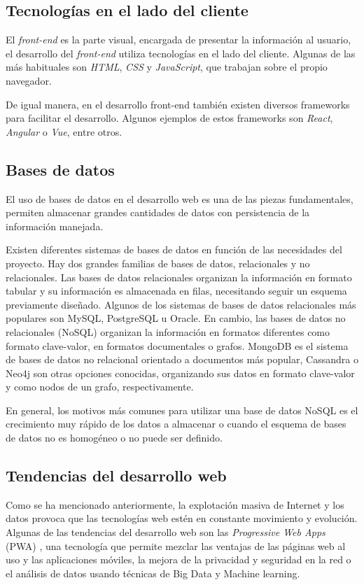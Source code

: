 \documentclass[a4paper, 12pt, oneside]{book}
\begin{document}
\subsection{Tecnologías en el lado del cliente}
\label{subsec:tecnlogías en el lado del cliente}
El \textit{front-end} es la parte visual, encargada de presentar la información al usuario, el desarrollo del \textit{front-end} utiliza tecnologías en el lado del cliente. Algunas de las más habituales son \textit{HTML}, \textit{CSS} y \textit{JavaScript}, que trabajan sobre el propio navegador.

De igual manera, en el desarrollo front-end también existen diversos frameworks para facilitar el desarrollo. Algunos ejemplos de estos frameworks son \textit{React}, \textit{Angular} o \textit{Vue}, entre otros.

\subsection{Bases de datos}
\label{subsec: bases de datos}
El uso de bases de datos en el desarrollo web es una de las piezas fundamentales, permiten almacenar grandes cantidades de datos con persistencia de la información manejada.

Existen diferentes sistemas de bases de datos en función de las necesidades del proyecto. Hay dos grandes familias de bases de datos, relacionales y no relacionales. Las bases de datos relacionales organizan la información en formato tabular y su información es almacenada en filas, necesitando seguir un esquema previamente diseñado. Algunos de los sistemas de bases de datos relacionales más populares son MySQL, PostgreSQL u Oracle. En cambio, las bases de datos no relacionales (NoSQL) organizan la información en formatos diferentes como formato clave-valor, en formatos documentales o grafos. MongoDB es el sistema de bases de datos no relacional orientado a documentos más popular, Cassandra o Neo4j son otras opciones conocidas, organizando sus datos en formato clave-valor y como nodos de un grafo, respectivamente.

En general, los motivos más comunes para utilizar una base de datos NoSQL es el crecimiento muy rápido de los datos a almacenar o cuando el esquema de bases de datos no es homogéneo o no puede ser definido.

\subsection{Tendencias del desarrollo web}
\label{subsec: tendencias del desarrollo web}
Como se ha mencionado anteriormente, la explotación masiva de Internet y los datos provoca que las tecnologías web estén en constante movimiento y evolución. Algunas de las tendencias del desarrollo web son las \textit{Progressive Web Apps} (PWA) \cite{pwa}, una tecnología que permite mezclar las ventajas de las páginas web al uso y las aplicaciones móviles, la mejora de la privacidad y seguridad en la red o el análisis de datos usando técnicas de Big Data y Machine learning. 
\end{document}

